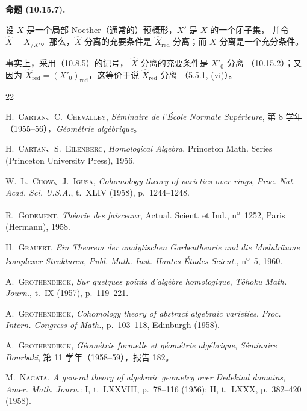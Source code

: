 \documentclass[UTF8,fontset=none,11pt,oneside,openany]{ctexbook}
\newenvironment{proposition}[1][]{%
  \par\medskip\noindent\textbf{命题 (#1).}\ %
}{\par}
\newcommand{\oldpage}[2][]{%
  \hypertarget{ega-source-page-#1-#2}{}%
  \marginnote{\scriptsize\textbf{#1}~|~#2}\ignorespaces}
\let\EGAOriginalLabel\label
\renewcommand{\label}[1]{\phantomsection\EGAOriginalLabel{#1}}
\begin{document}
\begin{proposition}[10.15.7]
\label{I.10.15.7-fr}
设 $X$ 是一个局部 Noether（通常的）预概形，$X'$ 是 $X$ 的一个闭子集，
并令 $\widehat{X}=X_{/X'}$。那么，$\widehat{X}$ 分离的充要条件是
$\widehat{X}_{\mathrm{red}}$ 分离；而 $X$ 分离是一个充分条件。
\end{proposition}

事实上，采用（\hyperref[I.10.8.5-fr]{10.8.5}）的记号，
$\widehat{X}$ 分离的充要条件是 $X'_0$ 分离
（\hyperref[I.10.15.2-fr]{10.15.2}）；又因为
$\widehat{X}_{\mathrm{red}}=(X'_0)_{\mathrm{red}}$，这等价于说
$\widehat{X}_{\mathrm{red}}$ 分离
（\hyperref[I.5.5.1-fr]{5.5.1, (vi)}）。
\begin{thebibliography}{22}
\oldpage[I]{214}

H.~\textsc{Cartan}、C.~\textsc{Chevalley},
\emph{Séminaire de l'École Normale Supérieure},
第 8 学年（1955--56），\emph{Géométrie algébrique}。

H.~\textsc{Cartan}、S.~\textsc{Eilenberg},
\emph{Homological Algebra}, Princeton Math. Series (Princeton University
Press), 1956.

W.~L.~\textsc{Chow}、J.~\textsc{Igusa},
\emph{Cohomology theory of varieties over rings},
\emph{Proc. Nat. Acad. Sci. U.S.A.}, t.~XLIV (1958), p.~1244--1248.

R.~\textsc{Godement}, \emph{Théorie des faisceaux}, Actual. Scient. et Ind.,
n\textsuperscript{o}~1252, Paris (Hermann), 1958.

H.~\textsc{Grauert},
\emph{Ein Theorem der analytischen Garbentheorie und die Modulräume komplexer
Strukturen}, \emph{Publ. Math. Inst. Hautes Études Scient.},
n\textsuperscript{o}~5, 1960.

A.~\textsc{Grothendieck}, \emph{Sur quelques points d'algèbre homologique},
\emph{Tôhoku Math. Journ.}, t.~IX (1957), p.~119--221.

A.~\textsc{Grothendieck},
\emph{Cohomology theory of abstract algebraic varieties},
\emph{Proc. Intern. Congress of Math.}, p.~103--118, Edinburgh (1958).

A.~\textsc{Grothendieck},
\emph{Géométrie formelle et géométrie algébrique},
\emph{Séminaire Bourbaki}, 第 11 学年（1958--59），报告 182。

M.~\textsc{Nagata},
\emph{A general theory of algebraic geometry over Dedekind domains},
\emph{Amer. Math. Journ.}: I, t.~LXXVIII, p.~78--116 (1956);
II, t.~LXXX, p.~382--420 (1958).


\end{thebibliography}
\end{document}

